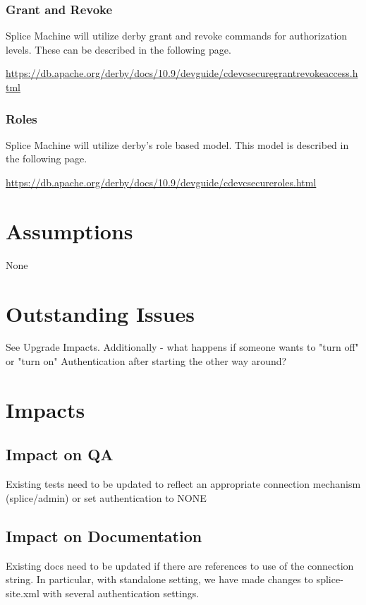\documentclass{article}
\begin{document}
\subsubsection{Grant and Revoke}

Splice Machine will utilize derby grant and revoke commands for
authorization levels.  These can be described in the following page.

\url{https://db.apache.org/derby/docs/10.9/devguide/cdevcsecuregrantrevokeaccess.html}

\subsubsection{Roles}

Splice Machine will utilize derby's role based model.  This model is described
in the following page.

\url{https://db.apache.org/derby/docs/10.9/devguide/cdevcsecureroles.html}


\section{Assumptions}

None

\section{Outstanding Issues}

See Upgrade Impacts.  Additionally - what happens if someone wants to "turn off" or "turn on" Authentication after starting the other way around?

\section{Impacts}

\subsection{Impact on QA}

Existing tests need to be updated to reflect an appropriate connection mechanism (splice/admin) or set authentication to NONE

\subsection{Impact on Documentation} 

Existing docs need to be updated if there are references to use of the connection string. In particular, with standalone setting, we have made changes 
to splice-site.xml with several authentication settings. 
\end{document}

